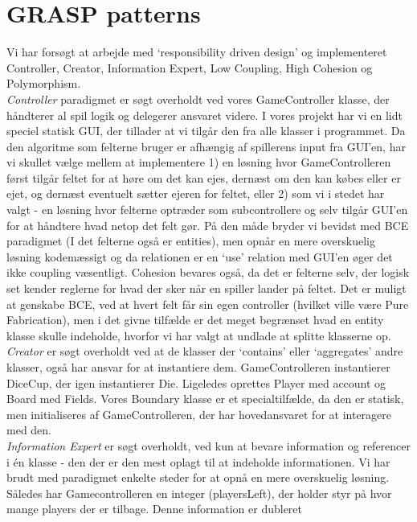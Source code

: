 \section*{GRASP patterns}
Vi har forsøgt at arbejde med ‘responsibility driven design’ og implementeret
Controller, Creator, Information Expert, Low Coupling, High Cohesion og
Polymorphism.\\
\indent \emph{Controller} paradigmet er søgt overholdt ved vores GameController
klasse, der håndterer al spil logik og delegerer ansvaret videre. I vores projekt har vi
en lidt speciel statisk GUI, der tillader at vi tilgår den fra alle klasser i
programmet. Da den algoritme som felterne bruger er afhængig af spillerens
input fra GUI’en, har vi skullet vælge mellem at implementere 1) en løsning
hvor GameControlleren først tilgår feltet for at høre om det kan ejes, dernæst
om den kan købes eller er ejet, og dernæst eventuelt sætter ejeren for feltet,
eller 2) som vi i stedet har valgt - en løsning hvor felterne optræder som
subcontrollere og selv tilgår GUI’en for at håndtere hvad netop det felt gør.
På den måde bryder vi bevidst med BCE paradigmet (I det felterne også er
entities), men opnår en mere overskuelig løsning kodemæssigt og da relationen
er en ‘use’ relation med GUI’en øger det ikke coupling væsentligt. Cohesion
bevares også, da det er felterne selv, der logisk set kender reglerne for hvad
der sker når en spiller lander på feltet. Det er muligt at genskabe BCE, ved at
hvert felt får sin egen controller (hvilket ville være Pure Fabrication), men i
det givne tilfælde er det meget begrænset hvad en entity klasse skulle
indeholde, hvorfor vi har valgt at undlade at splitte klasserne op.\\
\indent \emph{Creator} er søgt overholdt ved at de klasser der ‘contains’ eller
‘aggregates’ andre klasser, også har ansvar for at instantiere dem. GameControlleren
instantierer DiceCup, der igen instantierer Die. Ligeledes oprettes Player med
account og Board med Fields. Vores Boundary klasse er et specialtilfælde, da den
er statisk, men initialiseres af GameControlleren, der har hovedansvaret for at
interagere med den.\\
\indent \emph{Information Expert} er søgt overholdt, ved kun at bevare
information og referencer i én klasse - den der er den mest oplagt til at indeholde
informationen. Vi har brudt med paradigmet enkelte steder for at opnå en mere
overskuelig løsning. Således har Gamecontrolleren en integer (playersLeft), der
holder styr på hvor mange players der er tilbage. Denne information er dubleret
